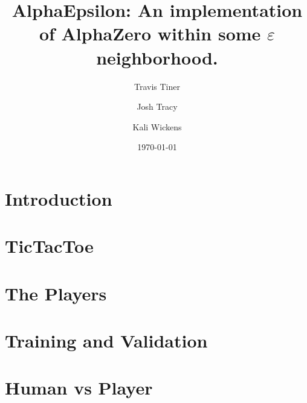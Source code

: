 \documentclass[11pt]{article}
\title{AlphaEpsilon: An implementation of AlphaZero within some $\varepsilon$ neighborhood.}
\author{Travis Tiner}
\author{Josh Tracy}
\author{Kali Wickens}
\affil{University of Utah -- Deep Learning}
\date{\today}
\begin{document}
\maketitle

\section{Introduction}

	

\section{TicTacToe}

	

\section{The Players}

	
	
	

\section{Training and Validation}

	

\section{Human vs Player}

	

%
%
%
%
%
\end{document}
